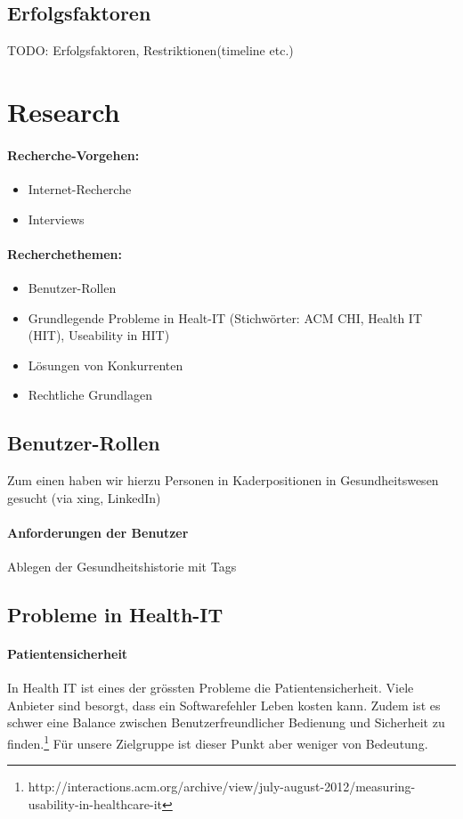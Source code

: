 \documentclass[a4paper]{scrreprt}
\begin{document}
\subsection{Erfolgsfaktoren}


TODO: Erfolgsfaktoren, Restriktionen(timeline etc.)

\section{Research}
\paragraph{Recherche-Vorgehen:} 
\begin{itemize}
\item Internet-Recherche
\item Interviews
\end{itemize}


\paragraph{Recherchethemen:} 
\begin{itemize}
\item Benutzer-Rollen
\item Grundlegende Probleme in Healt-IT (Stichwörter: ACM CHI, Health IT (HIT), Useability in HIT)
\item Lösungen von Konkurrenten
\item Rechtliche Grundlagen
\end{itemize}

\subsection{Benutzer-Rollen}
Zum einen haben wir hierzu Personen in Kaderpositionen in Gesundheitswesen gesucht (via xing, LinkedIn) 




\paragraph{Anforderungen der Benutzer}
Ablegen der Gesundheitshistorie mit Tags


\subsection{Probleme in Health-IT}
\paragraph{Patientensicherheit} In Health IT ist eines der grössten Probleme die Patientensicherheit. Viele Anbieter sind besorgt, dass ein Softwarefehler Leben kosten kann. Zudem ist es schwer eine Balance zwischen Benutzerfreundlicher Bedienung und Sicherheit zu finden.\footnote{http://interactions.acm.org/archive/view/july-august-2012/measuring-usability-in-healthcare-it}
Für unsere Zielgruppe ist dieser Punkt aber weniger von Bedeutung.
\end{document}
